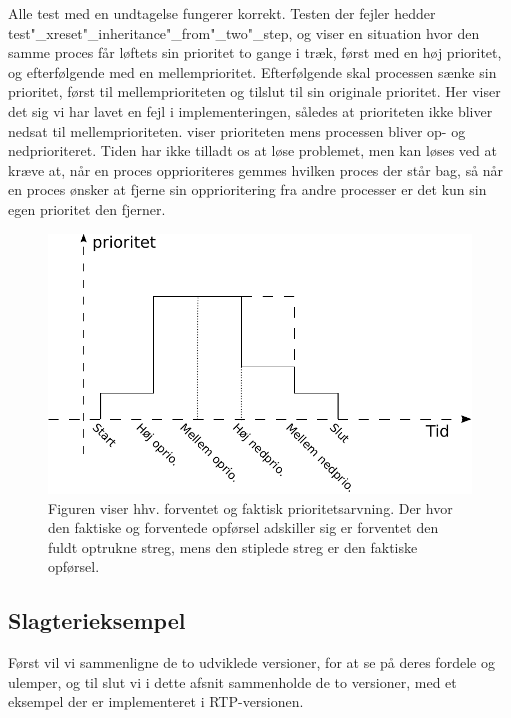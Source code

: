  Alle test med en undtagelse fungerer korrekt. Testen der fejler hedder test"_xreset"_inheritance"_from"_two"_step, og viser en situation hvor den samme proces får løftets sin prioritet to gange i træk, først med en høj prioritet, og efterfølgende med en mellemprioritet. Efterfølgende skal processen sænke sin prioritet, først til  mellemprioriteten og tilslut til sin originale prioritet. Her viser det sig vi har lavet en fejl i implementeringen, således at prioriteten ikke bliver nedsat til mellemprioriteten.  viser prioriteten mens processen bliver op- og nedprioriteret. Tiden har ikke tilladt os at løse problemet, men  kan løses ved at kræve at, når en proces opprioriteres gemmes hvilken proces der står bag, så når en proces ønsker at fjerne sin opprioritering fra andre processer er det kun sin egen  prioritet den fjerner.  
 
  
\begin{figure}
 \begin{center}
  \includegraphics[scale=1]{images/priority-inheritance}
	\caption{Figuren viser hhv. forventet og faktisk prioritetsarvning. Der hvor den faktiske og forventede opførsel adskiller sig er forventet den fuldt optrukne streg, mens den stiplede streg er den faktiske opførsel.}
	\label{fig:priority-inheritance}
\end{center}
\end{figure}
  

\subsection{Slagterieksempel}

Først vil vi sammenligne de to udviklede versioner, for at se på deres fordele og ulemper, og til slut vi i dette afsnit sammenholde de to versioner, med et  eksempel der er implementeret i RTP-versionen.

